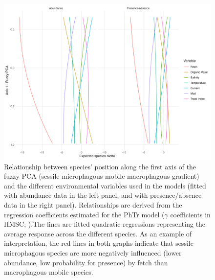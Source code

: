 \begin{figure}
\hypertarget{fig:chapt1supp28}{%
\centering
\includegraphics{03-Chapitre1/figures/supplementary/fig_supp28.png}
\caption{Relationship between species' position along the first axis of
the fuzzy PCA (sessile microphagous-mobile macrophagous gradient) and
the different environmental variables used in the models (fitted with
abundance data in the left panel, and with presence/absence data in the
right panel). Relationships are derived from the regression coefficients
estimated for the PhTr model (\(\gamma\) coefficients in HMSC;
\textcite{Ovaskainen_2020}).The lines are fitted quadratic regressions
representing the average response across the different species. As an
example of interpretation, the red lines in both graphs indicate that
sessile microphagous species are more negatively influenced (lower
abundance, low probability for presence) by fetch than macrophagous
mobile species.}\label{fig:chapt1supp28}
}
\end{figure}


